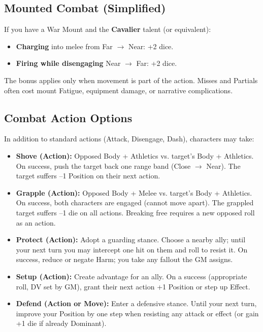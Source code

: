 \subsection{Mounted Combat (Simplified)}

If you have a War Mount and the \textbf{Cavalier} talent (or equivalent):
\begin{itemize}
  \item \textbf{Charging} into melee from Far $\rightarrow$ Near: +2 dice.
  \item \textbf{Firing while disengaging} Near $\rightarrow$ Far: +2 dice.
\end{itemize}

The bonus applies only when movement is part of the action. Misses and Partials often cost mount Fatigue, equipment damage, or narrative complications.

\subsection{Combat Action Options}

In addition to standard actions (Attack, Disengage, Dash), characters may take:

\begin{itemize}
  \item \textbf{Shove (Action):} Opposed Body + Athletics vs. target's Body + Athletics. On success, push the target back one range band (Close $\rightarrow$ Near). The target suffers --1 Position on their next action.
  \item \textbf{Grapple (Action):} Opposed Body + Melee vs. target's Body + Athletics. On success, both characters are engaged (cannot move apart). The grappled target suffers --1 die on all actions. Breaking free requires a new opposed roll as an action.
  \item \textbf{Protect (Action):} Adopt a guarding stance. Choose a nearby ally; until your next turn you may intercept one hit on them and roll to resist it. On success, reduce or negate Harm; you take any fallout the GM assigns.
  \item \textbf{Setup (Action):} Create advantage for an ally. On a success (appropriate roll, DV set by GM), grant their next action +1 Position or step up Effect.
  \item \textbf{Defend (Action or Move):} Enter a defensive stance. Until your next turn, improve your Position by one step when resisting any attack or effect (or gain +1 die if already Dominant).
\end{itemize}

